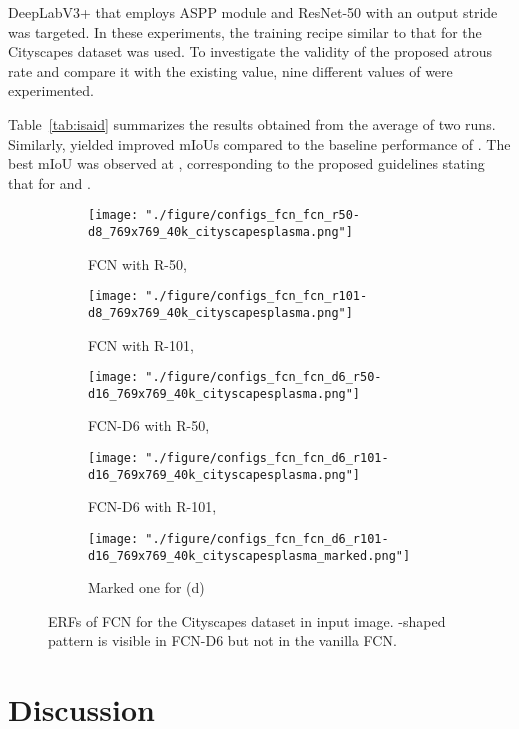\documentclass{article}
\def\tabref#1{Table~\ref{#1}}
\begin{document}
DeepLabV3+ that employs ASPP module and ResNet-50 with an output stride  was targeted. In these experiments, the training recipe similar to that for the Cityscapes dataset was used. To investigate the validity of the proposed atrous rate  and compare it with the existing value, nine different values of  were experimented.

\tabref{tab:isaid} summarizes the results obtained from the average of two runs. Similarly,  yielded improved mIoUs compared to the baseline performance of . The best mIoU was observed at , corresponding to the proposed guidelines stating that  for  and .

\begin{figure}[t!]
	\centering
	\begin{subfigure}[b]{0.191\linewidth}
		\centering
		\texttt{[image: "./figure/configs\_fcn\_fcn\_r50-d8\_769x769\_40k\_cityscapesplasma.png"]}
		\caption{FCN with R-50, }
	\end{subfigure}
	\hfill
	\begin{subfigure}[b]{0.191\linewidth}
		\centering
		\texttt{[image: "./figure/configs\_fcn\_fcn\_r101-d8\_769x769\_40k\_cityscapesplasma.png"]}
		\caption{FCN with R-101, }
	\end{subfigure}
	\hfill
	\begin{subfigure}[b]{0.191\linewidth}
		\centering
		\texttt{[image: "./figure/configs\_fcn\_fcn\_d6\_r50-d16\_769x769\_40k\_cityscapesplasma.png"]}
		\caption{FCN-D6 with R-50, }
	\end{subfigure}
	\hfill
	\begin{subfigure}[b]{0.191\linewidth}
		\centering
		\texttt{[image: "./figure/configs\_fcn\_fcn\_d6\_r101-d16\_769x769\_40k\_cityscapesplasma.png"]}
		\caption{FCN-D6 with R-101, }
	\end{subfigure}
	\hfill
	\begin{subfigure}[b]{0.191\linewidth}
		\centering
		\texttt{[image: "./figure/configs\_fcn\_fcn\_d6\_r101-d16\_769x769\_40k\_cityscapesplasma\_marked.png"]}
		\caption{Marked one for (d)}
	\end{subfigure}
	\caption{ERFs of FCN for the Cityscapes dataset in  input image. -shaped pattern is visible in FCN-D6 but not in the vanilla FCN.}
	\label{fig:fcn}
\end{figure}



\section{Discussion}
\label{sec:disc}
\end{document}
